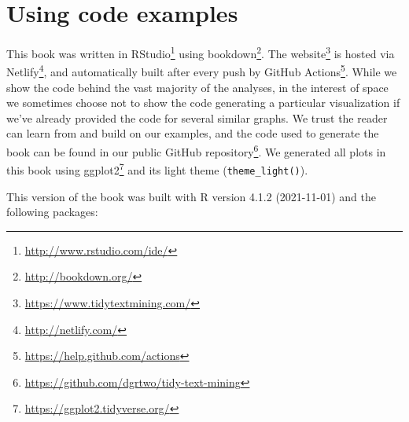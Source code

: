 \documentclass[
]{book}
\DeclareRobustCommand{\href}[2]{#2\footnote{\url{#1}}}
\begin{document}
\hypertarget{using-code-examples}{%
\section*{Using code examples}\label{using-code-examples}}

This book was written in \href{http://www.rstudio.com/ide/}{RStudio} using \href{http://bookdown.org/}{bookdown}. The \href{https://www.tidytextmining.com/}{website} is hosted via \href{http://netlify.com/}{Netlify}, and automatically built after every push by \href{https://help.github.com/actions}{GitHub Actions}. While we show the code behind the vast majority of the analyses, in the interest of space we sometimes choose not to show the code generating a particular visualization if we've already provided the code for several similar graphs. We trust the reader can learn from and build on our examples, and the code used to generate the book can be found in our \href{https://github.com/dgrtwo/tidy-text-mining}{public GitHub repository}. We generated all plots in this book using \href{https://ggplot2.tidyverse.org/}{ggplot2} and its light theme (\texttt{theme\_light()}).

This version of the book was built with R version 4.1.2 (2021-11-01) and the following packages:
\end{document}
